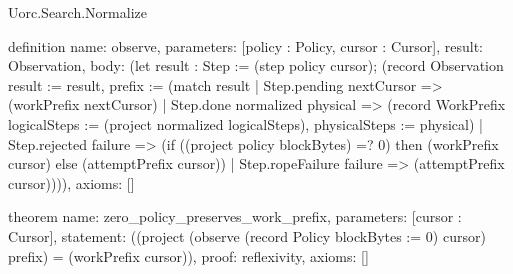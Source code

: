\begin{lexlean}{Uorc.Search.Normalize}
\begin{semanticmodule}
definition{
  name: observe,
  parameters: [policy : Policy, cursor : Cursor],
  result: Observation,
  body: (let result : Step := (step policy cursor); (record Observation {result := result, prefix := (match result
    | Step.pending nextCursor => (workPrefix nextCursor)
    | Step.done normalized physical => (record WorkPrefix {logicalSteps := (project normalized logicalSteps), physicalSteps := physical})
    | Step.rejected failure => (if ((project policy blockBytes) =? 0) then (workPrefix cursor) else (attemptPrefix cursor))
    | Step.ropeFailure failure => (attemptPrefix cursor))})),
  axioms: []
}

theorem{
  name: zero_policy_preserves_work_prefix,
  parameters: [cursor : Cursor],
  statement: ((project (observe (record Policy {blockBytes := 0}) cursor) prefix) = (workPrefix cursor)),
  proof: reflexivity{},
  axioms: []
}
\end{semanticmodule}
\end{lexlean}
